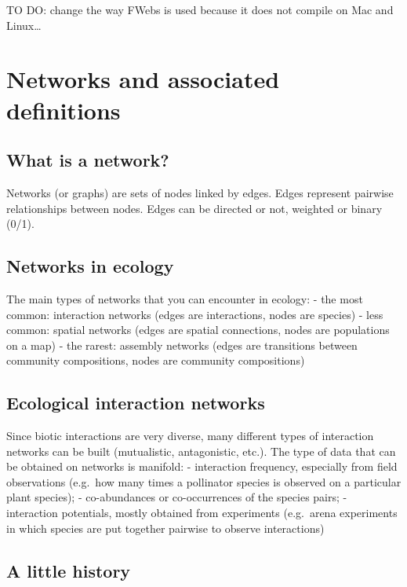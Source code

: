 \documentclass[
]{book}
\theoremstyle{definition}
\theoremstyle{definition}
\theoremstyle{definition}
\theoremstyle{definition}
\theoremstyle{remark}
\begin{document}
TO DO: change the way FWebs is used because it does not compile on Mac and Linux\ldots{}

\section{Networks and associated definitions}\label{networks-and-associated-definitions}

\subsection{What is a network?}\label{what-is-a-network}

Networks (or graphs) are sets of nodes linked by edges.
Edges represent pairwise relationships between nodes.
Edges can be directed or not, weighted or binary (0/1).

\subsection{Networks in ecology}\label{networks-in-ecology}

The main types of networks that you can encounter in ecology:
- the most common: interaction networks (edges are interactions, nodes are species)
- less common: spatial networks (edges are spatial connections, nodes are populations on a map)
- the rarest: assembly networks (edges are transitions between community compositions, nodes are community compositions)

\subsection{Ecological interaction networks}\label{ecological-interaction-networks}

Since biotic interactions are very diverse, many different types of interaction networks can be built (mutualistic, antagonistic, etc.).
The type of data that can be obtained on networks is manifold:
- interaction frequency, especially from field observations (e.g.~how many times a pollinator species is observed on a particular plant species);
- co-abundances or co-occurrences of the species pairs;
- interaction potentials, mostly obtained from experiments (e.g.~arena experiments in which species are put together pairwise to observe interactions)

\subsection{A little history}\label{a-little-history}
\end{document}
